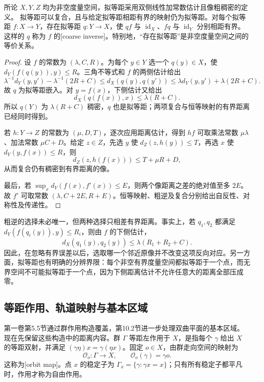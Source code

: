 \begin{proposition}\label{g3:prop:D-quasi-isometry-inverse}
	所论 \(X,Y,Z\) 均为非空度量空间，拟等距采用双侧线性加常数估计且像粗稠密的定义。
	拟等距可以复合，且与给定拟等距相距有界的映射仍为拟等距。对每个拟等距 \(f:X\to Y\)，存在拟等距 \(q:Y\to X\)，使 \(qf\) 与 \(\operatorname{id}_X\)、\(fq\) 与 \(\operatorname{id}_Y\) 分别相距有界。这样的 \(q\) 称为 \(f\) 的[coarse inverse]。特别地，“存在拟等距”是非空度量空间之间的等价关系。
\end{proposition}
\begin{proof}
	设 \(f\) 的常数为 \((\lambda,C,R)\)。为每个 \(y\in Y\) 选一个 \(q(y)\in X\)，使
	\(d_Y(f(q(y)),y)\le R\)。三角不等式和 \(f\) 的两侧估计给出
	\[
		\lambda^{-1}d_Y(y,y')-\lambda^{-1}(2R+C)
		\le d_X(q(y),q(y'))
		\le\lambda d_Y(y,y')+\lambda(2R+C).
	\]
	故 \(q\) 为拟等距嵌入。对 \(y=f(x)\)，下侧估计又给出
	\[
		d_X(q(f(x)),x)\le\lambda(R+C).
	\]
	所以 \(q(Y)\) 为 \(\lambda(R+C)\) 稠密，\(q\) 也是拟等距；两项复合与恒等映射的有界距离已经同时得到。

	若 \(h:Y\to Z\) 的常数为 \((\mu,D,T)\)，逐次应用距离估计，得到 \(hf\) 可取乘法常数 \(\mu\lambda\)、加法常数 \(\mu C+D\)。给定 \(z\in Z\)，先选 \(y\) 使 \(d_Z(z,h(y))\le T\)，再选 \(x\) 使 \(d_Y(y,f(x))\le R\)，则
	\[
		d_Z(z,h(f(x)))\le T+\mu R+D,
	\]
	从而复合仍有稠密到有界距离的像。

	最后，若 \(\sup_xd_Y(f(x),f'(x))\le E\)，则两个像距离之差的绝对值至多 \(2E\)。故 \(f'\) 可取常数 \((\lambda,C+2E,R+E)\)。恒等映射、粗逆及复合分别给出自反性、对称性及传递性。
\end{proof}

粗逆的选择未必唯一，但两种选择只相差有界距离。事实上，若 \(q_1,q_2\) 都满足 \(d_Y(f(q_i(y)),y)\le R_i\)，则由 \(f\) 的下侧估计，
\[
	d_X(q_1(y),q_2(y))\le\lambda(R_1+R_2+C).
\]
因此，在忽略有界误差以后，选取哪一个邻近原像并不改变这项反向对应。另一方面，拟等距也有明确的分辨界限：每个非空有界度量空间都拟等距于一个点，而无界空间不可能拟等距于一个点，因为下侧距离估计不允许任意大的距离全部压成零。

\subsection{等距作用、轨道映射与基本区域}
\label{g3:subsec:D01:03}

第一卷第5.5节通过群作用构造覆盖，第10.2节进一步处理双曲平面的基本区域。现在先保留这些构造中的距离内容。群 \(\Gamma\) 等距左作用于 \(X\)，是指每个 \(\gamma\) 给出 \(X\) 的等距双射，并满足 \((\gamma\eta)x=\gamma(\eta x)\)。固定 \(o\in X\)，由群走向空间的映射为
\begin{equation}\label{g3:eq:D-orbit-map}
	\mathcal O_o:\Gamma\longrightarrow X,\qquad
	\mathcal O_o(\gamma)=\gamma o.
\end{equation}
这称为[orbit map]。点 \(x\) 的稳定子为
\(\Gamma_x=\{\gamma:\gamma x=x\}\)；只有所有稳定子都平凡时，作用才称为自由作用。

